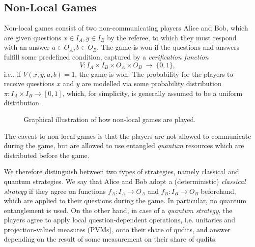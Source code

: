 \subsection{Non-Local Games}
Non-local games consist of two non-communicating players Alice and Bob, which are given 
questions $x \in I_A, y \in I_B$ by the referee, to which they must respond with an answer $a \in O_A, b \in O_B$.
The game is won if the questions and answers fulfill some predefined condition,
captured by a \emph{verification function}
\[ V: I_A \times I_B \times O_A \times O_B~\rightarrow~\{0, 1\}, \]
i.e., if $V(x, y, a, b) = 1$, the game is won.
The probability for the players to receive questions $x$ and $y$ 
are modelled via some probability distribution $\pi: I_A \times I_B \rightarrow [0, 1]$,
which, for simplicity, is generally assumed to be a uniform distribution.

\begin{figure}[t]
    \centering
    \caption{Graphical illustration of how non-local games are played.}
\end{figure}
The caveat to non-local games is that the players are not allowed to communicate 
during the game, but are allowed to use entangled \emph{quantum} resources which are distributed before the game.

We therefore distinguish between two types of strategies, namely classical and quantum strategies.
We say that Alice and Bob adopt a (deterministic) \emph{classical strategy} if they agree on functions $f_A: I_A \rightarrow O_A$
and $f_B: I_B \rightarrow O_B$ beforehand, which are applied to their questions during the game.
In particular, no quantum entanglement is used. 
On the other hand, in case of a \emph{quantum strategy}, the players agree to apply local question-dependent 
operations, i.e. unitaries and projection-valued measures (PVMs), onto their share of qudits, 
and answer depending on the result of some measurement on their share of qudits.

